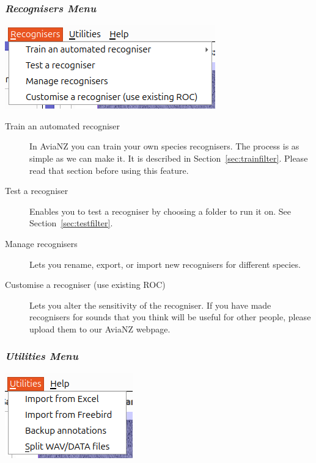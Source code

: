 \documentclass{article}
\begin{document}
\subsubsection{{\em Recognisers Menu}}

\begin{center}
\includegraphics[width=.4\textwidth]{Figures/RecognisersMenu}
\end{center}

\begin{description}
\item [Train an automated recogniser] In AviaNZ you can train your own species recognisers. The process is as simple as we can make it. It is described in Section~\ref{sec:trainfilter}. Please read that section before using this feature.
\item [Test a recogniser] Enables you to test a recogniser by choosing a folder to run it on. See Section~\ref{sec:testfilter}.
\item[Manage recognisers] Lets you rename, export, or import new recognisers for different species. 
\item[Customise a recogniser (use existing ROC)] Lets you alter the sensitivity of the recogniser.
If you have made recognisers for sounds that you think will be useful for other people, please upload them to our AviaNZ webpage.   
\end{description}

\subsubsection{{\em Utilities Menu} \label{sec:utilities}}

\begin{center}
\includegraphics[width=.25\textwidth]{Figures/UtilitiesMenu}
\end{center}
\end{document}
